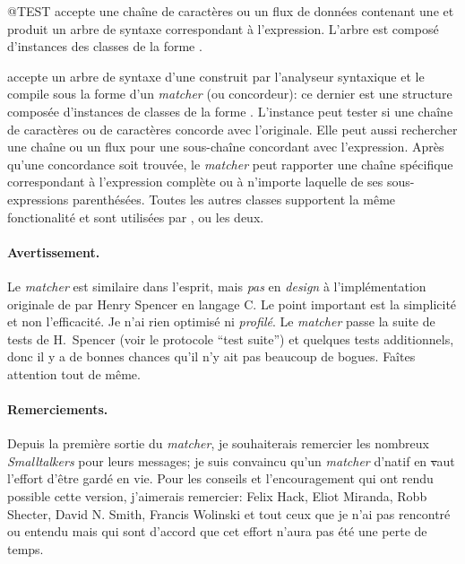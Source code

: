 \documentclass[a4paper,10pt,twoside]{book}
\begin{document}
\begin{code}{@TEST}
 accepte une chaîne de caractères ou un flux de
données contenant une \expreg et produit un arbre de syntaxe
correspondant à l'expression. L'arbre est composé d'instances des
classes de la forme .

 accepte un arbre de syntaxe d'une \expreg construit
par l'analyseur syntaxique et le compile sous la forme d'un
\emph{matcher} (ou concordeur): ce dernier est une structure composée
d'instances de classes de la forme . 
L'instance  peut tester si une chaîne de caractères
ou  %
de caractères concorde avec l'\expreg originale. Elle peut aussi
rechercher une chaîne ou un flux pour une sous-chaîne concordant avec
l'expression. Après qu'une concordance soit trouvée, le \emph{matcher}
peut rapporter une chaîne spécifique correspondant à l'expression
complète ou à n'importe laquelle de ses sous-expressions parenthésées.
Toutes les autres classes supportent la même fonctionalité et sont
utilisées par ,  ou les deux.

\paragraph{Avertissement.} Le \emph{matcher} est similaire dans
l'esprit, mais \emph{pas} en \emph{design}
à l'implémentation originale de \expreg par Henry Spencer en langage
C. Le point important est la simplicité et non l'efficacité. Je n'ai
rien optimisé ni \emph{profilé}.
Le \emph{matcher} passe la suite de tests de H.~Spencer (voir le
protocole ``test suite'') et quelques tests additionnels, donc il y a
de bonnes chances qu'il n'y ait pas beaucoup de bogues. Faîtes
attention tout de même. 

\paragraph{Remerciements.}
Depuis la première sortie du \emph{matcher}, je souhaiterais remercier
les nombreux \emph{Smalltalkers} pour leurs messages; je suis
convaincu qu'un \emph{matcher} d'\expreg natif en \st vaut l'effort 
d'être gardé en vie. Pour les conseils et l'encouragement qui ont rendu
possible cette version, j'aimerais remercier:
Felix Hack, Eliot Miranda, Robb Shecter, David N. Smith, Francis
Wolinski et tout ceux que je n'ai pas rencontré ou entendu mais qui sont
d'accord que cet effort n'aura pas été une perte de temps.


\end{code}
\end{document}
